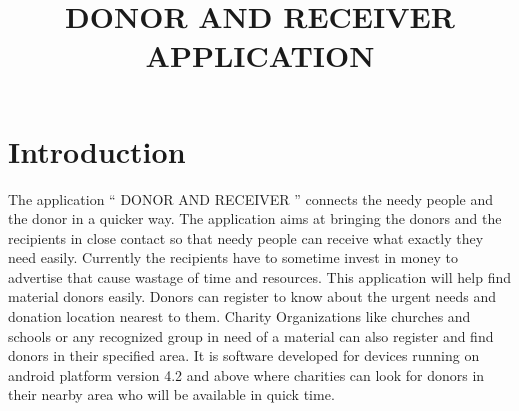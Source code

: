 \documentclass[a4paper,12pt]{article}
\begin{document}
\title{DONOR AND RECEIVER APPLICATION}
\author{}
\date{}
\maketitle

\section{Introduction}
The application “ DONOR AND RECEIVER ” connects the needy people and the donor in a quicker way.  The application aims at bringing the donors and the recipients in close contact so that needy people can receive what exactly they need easily. Currently the recipients have to sometime invest in money to advertise that cause wastage of time and resources.
This application will help find material donors easily. Donors can register to know about the urgent needs and donation location nearest to them. Charity Organizations like churches and schools or any recognized group in need of a material can also register and find donors in their specified area.
It is software developed for devices running on android platform version 4.2 and above where charities can look for donors in their nearby area who will be available in quick time.
\end{document}
